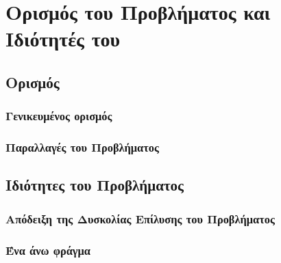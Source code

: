 

\chapter{Ορισμός του Προβλήματος και Ιδιότητές του}
\section{Ορισμός}
\subsection{Γενικευμένος ορισμός}
\subsection{Παραλλαγές του Προβλήματος}

\section{Ιδιότητες του Προβλήματος}
\subsection{Απόδειξη της Δυσκολίας Επίλυσης του Προβλήματος}
\subsection{Ένα άνω φράγμα}
